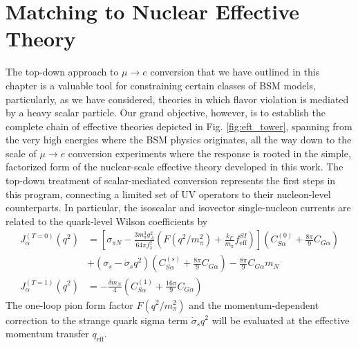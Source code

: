 \documentclass[12pt,letterpaper]{book}
\begin{document}
\section{Matching to Nuclear Effective Theory}
The top-down approach to $\mu\rightarrow e$ conversion that we have outlined in this chapter is a valuable tool for constraining certain classes of BSM models, particularly, as we have considered, theories in which flavor violation is mediated by a heavy scalar particle. Our grand objective, however, is to establish the complete chain of effective theories depicted in Fig. \ref{fig:eft_tower}, spanning from the very high energies where the BSM physics originates, all the way down to the scale of $\mu\rightarrow e$ conversion experiments where the response is rooted in the simple, factorized form of the nuclear-scale effective theory developed in this work. The top-down treatment of scalar-mediated conversion represents the first steps in this program, connecting a limited set of UV operators to their nucleon-level counterparts. In particular, the isoscalar and isovector single-nucleon currents are related to the quark-level Wilson coefficients by 
\begin{equation}
\begin{split}
J_{\alpha}^{(T=0)}(q^2)&=\left[\sigma_{\pi N}-\frac{3m_{\pi}^3g_A^2}{64\pi f_{\pi}^2}\left(F\left(q^2/m_{\pi}^2\right)+\frac{k_F}{m_{\pi}}f^{SI}_\mathrm{eff}\right)\right]\left(C^{(0)}_{S\alpha}+\frac{8\pi}{9}C_{G\alpha}\right)\\
&+\left(\sigma_s-\dot{\sigma}_sq^2\right)\left(C^{(s)}_{S\alpha}+\frac{8\pi}{9}C_{G\alpha}\right)-\frac{8\pi}{9}C_{G\alpha}m_N\\
J_{\alpha}^{(T=1)}(q^2)&=-\frac{\delta m_N}{4}\left(C_{S\alpha}^{(1)}+\frac{16\pi}{9}C_{G\alpha}\right)
\end{split}
\end{equation}
The one-loop pion form factor $F(q^2/m_{\pi}^2)$ and the momentum-dependent correction to the strange quark sigma term $\dot{\sigma}_sq^2$ will be evaluated at the effective momentum transfer $q_\mathrm{eff}$.
\end{document}
